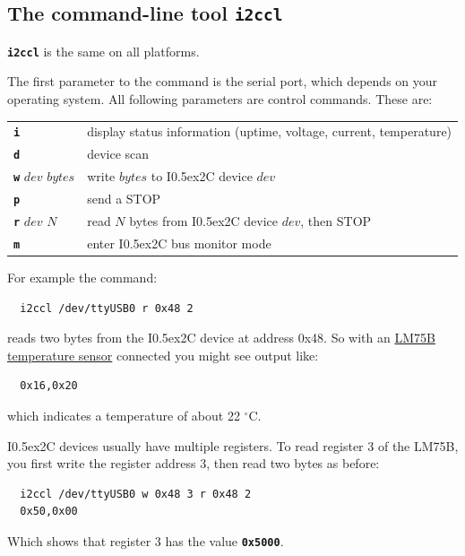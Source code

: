 \documentclass{article}
\newcommand{\two}{\raise0.5ex\hbox{\footnotesize{2}}}
\newcommand{\iic}{I\two{}C}
\newcommand{\degc}{$^{\circ}$C}
\newcommand{\mach}[1]{\texttt{\textbf{#1}}}
\newcommand{\gap}{\vspace{10pt}}
\begin{document}
\subsection{The command-line tool \mach{i2ccl}}

\mach{i2ccl} is the same on all platforms.

The first parameter to the command is the serial port, which depends on your operating system.
All following parameters are control commands. These are:

\begin{tabular}{ll}
  \mach{i}               & display status information (uptime, voltage, current, temperature) \\
  \mach{d}               & device scan \index{bus scan} \\
  \mach{w} $dev$ $bytes$ & write $bytes$ to \iic{} device $dev$ \\
  \mach{p}               & send a STOP \\
  \mach{r} $dev$ $N$     & read $N$ bytes from \iic{} device $dev$, then STOP \\
  \mach{m}               & enter \iic{} bus monitor mode \\
\end{tabular}\gap

For example the command:

\begin{lstlisting}
  i2ccl /dev/ttyUSB0 r 0x48 2
\end{lstlisting}

reads two bytes from the \iic{} device at address 0x48.
So with an
\href{https://www.nxp.com/docs/en/data-sheet/LM75B.pdf}{LM75B temperature sensor}
connected you might see output like:

\begin{lstlisting}
  0x16,0x20
\end{lstlisting}

which indicates a temperature of about 22 \degc.

\iic{} devices usually have multiple registers. 
To read register 3 of the LM75B, you first write the register address 3, then read two bytes as before:

\begin{lstlisting}
  i2ccl /dev/ttyUSB0 w 0x48 3 r 0x48 2
  0x50,0x00
\end{lstlisting}

Which shows that register 3 has the value \mach{0x5000}.
\end{document}
